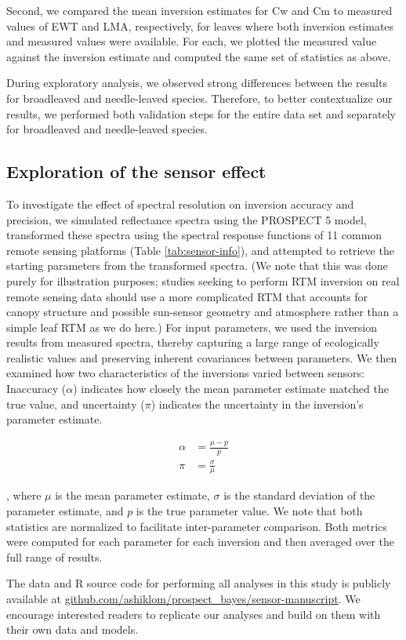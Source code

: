 Second, we compared the mean inversion estimates for Cw and Cm to measured
values of EWT and LMA, respectively, for leaves where both inversion estimates
and measured values were available. For each, we plotted the measured value
against the inversion estimate and computed the same set of statistics as
above.

During exploratory analysis, we observed strong differences between the
results for broadleaved and needle-leaved species. Therefore, to better
contextualize our results, we performed both validation steps for the entire
data set and separately for broadleaved and needle-leaved species.

\subsection{Exploration of the sensor effect} \label{ss:m-sensor-effect}

To investigate the effect of spectral resolution on inversion accuracy and
precision, we simulated reflectance spectra using the PROSPECT 5 model,
transformed these spectra using the spectral response functions of 11 common
remote sensing platforms (Table \ref{tab:sensor-info}), and attempted to
retrieve the starting parameters from the transformed spectra. (We note that
this was done purely for illustration purposes; studies seeking to perform RTM
inversion on real remote sensing data should use a more complicated RTM that
accounts for canopy structure and possible sun-sensor geometry and atmosphere
rather than a simple leaf RTM as we do here.)  For input parameters, we used
the inversion results from measured spectra, thereby capturing a large range
of ecologically realistic values and preserving inherent covariances between
parameters. We then examined how two characteristics of the inversions varied
between sensors: Inaccuracy ($\alpha$) indicates how closely the mean parameter
estimate matched the true value, and uncertainty ($\pi$) indicates the
uncertainty in the inversion's parameter estimate.

\begin{align}
  \alpha &= \frac{\mu - p}{p} \\
  \pi &= \frac{\sigma}{\mu}
\end{align}

, where $\mu$ is the mean parameter estimate, $\sigma$ is the standard
deviation of the parameter estimate, and $p$ is the true parameter value. We
note that both statistics are normalized to facilitate inter-parameter
comparison. Both metrics were computed for each parameter for each inversion
and then averaged over the full range of results.



The data and R source code for performing all analyses in this study is
publicly available at
\url{github.com/ashiklom/prospect_bayes/sensor-manuscript}. We encourage
 interested readers to replicate our analyses and build on them with their own
data and models.
